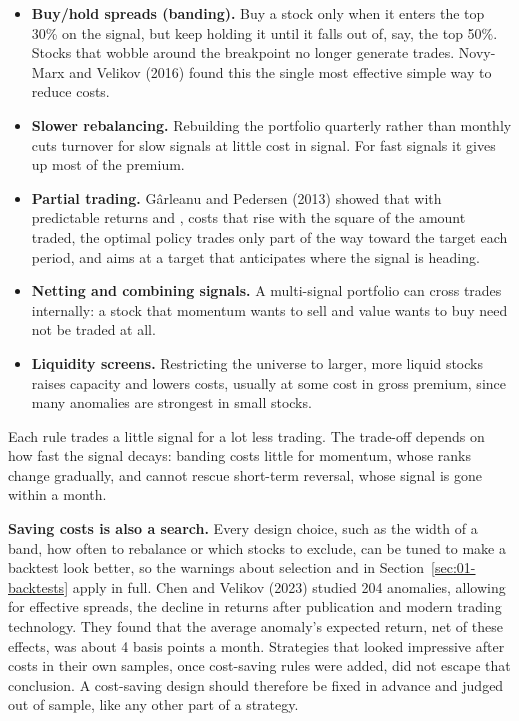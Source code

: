 \begin{itemize}
  \item \textbf{Buy/hold spreads (banding).} Buy a stock only when it enters the top 30\% on the signal, but keep holding it until it falls out of, say, the top 50\%. Stocks that wobble around the breakpoint no longer generate trades. Novy-Marx and Velikov (2016) found this the single most effective simple way to reduce costs.
  \item \textbf{Slower rebalancing.} Rebuilding the portfolio quarterly rather than monthly cuts turnover for slow signals at little cost in signal. For fast signals it gives up most of the premium.
  \item \textbf{Partial trading.} G\^arleanu and Pedersen (2013) showed that with predictable returns and , costs that rise with the square of the amount traded, the optimal policy trades only part of the way toward the target each period, and aims at a target that anticipates where the signal is heading.
  \item \textbf{Netting and combining signals.} A multi-signal portfolio can cross trades internally: a stock that momentum wants to sell and value wants to buy need not be traded at all.
  \item \textbf{Liquidity screens.} Restricting the universe to larger, more liquid stocks raises capacity and lowers costs, usually at some cost in gross premium, since many anomalies are strongest in small stocks.
\end{itemize}

Each rule trades a little signal for a lot less trading. The trade-off depends on how fast the signal decays: banding costs little for momentum, whose ranks change gradually, and cannot rescue short-term reversal, whose signal is gone within a month.

\textbf{Saving costs is also a search.} Every design choice, such as the width of a band, how often to rebalance or which stocks to exclude, can be tuned to make a backtest look better, so the warnings about selection and  in Section~\ref{sec:01-backtests} apply in full. Chen and Velikov (2023) studied 204 anomalies, allowing for effective spreads, the decline in returns after publication and modern trading technology. They found that the average anomaly's expected return, net of these effects, was about 4 basis points a month. Strategies that looked impressive after costs in their own samples, once cost-saving rules were added, did not escape that conclusion. A cost-saving design should therefore be fixed in advance and judged out of sample, like any other part of a strategy.


